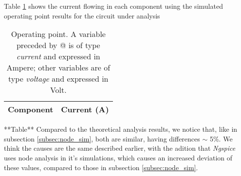 Table \ref{tab:mesh_sim} shows the current flowing in each component using the simulated operating point results for the circuit under analysis
\begin{table}[H]
  \centering
  \begin{tabular}{|l|r|}
    \hline    
    {\bf Component} & {\bf Current (A)} \\ \hline
    
  \end{tabular}
  \caption{Operating point. A variable preceded by @ is of type {\em current}
    and expressed in Ampere; other variables are of type {\it voltage} and expressed in
    Volt.}
  \label{tab:mesh_sim}
\end{table}
**Table**
Compared to the theoretical analysis results, we notice that, like in subsection \ref{subsec:node_sim}, both are similar, having differences $\sim$ 5\%. We think the causes are the same described earlier, with the adition that \textit{Ngspice} uses node analysis in it's simulations, which causes an increased deviation of these values, compared to those in subsection \ref{subsec:node_sim}.


